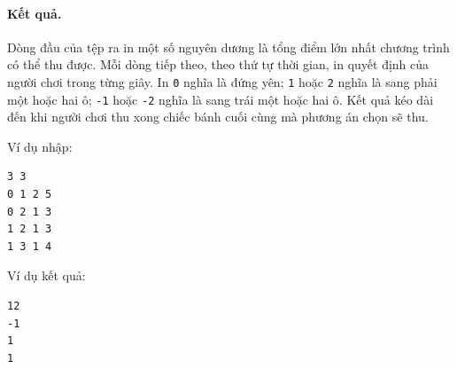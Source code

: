 \documentclass[11pt]{article}
\begin{document}
\paragraph{Kết quả.}
Dòng đầu của tệp ra in một số nguyên dương là tổng điểm lớn nhất chương trình
có thể thu được. Mỗi dòng tiếp theo, theo thứ tự thời gian, in quyết định của
người chơi trong từng giây. In \texttt{0} nghĩa là đứng yên; \texttt{1} hoặc
\texttt{2} nghĩa là sang phải một hoặc hai ô; \texttt{-1} hoặc \texttt{-2}
nghĩa là sang trái một hoặc hai ô. Kết quả kéo dài đến khi người chơi thu xong
chiếc bánh cuối cùng mà phương án chọn sẽ thu.

Ví dụ nhập:
\begin{verbatim}
3 3
0 1 2 5
0 2 1 3
1 2 1 3
1 3 1 4
\end{verbatim}

Ví dụ kết quả:
\begin{verbatim}
12
-1
1
1
\end{verbatim}
\end{document}
